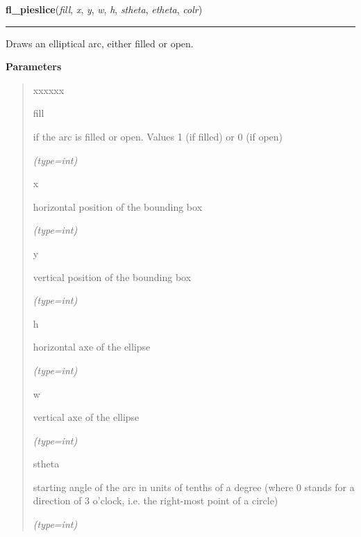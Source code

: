 \hspace{.8\funcindent}\begin{boxedminipage}{\funcwidth}

    \raggedright \textbf{fl\_pieslice}(\textit{fill}, \textit{x}, \textit{y}, \textit{w}, \textit{h}, \textit{stheta}, \textit{etheta}, \textit{colr})

    \vspace{-1.5ex}

    \rule{\textwidth}{0.5\fboxrule}
\setlength{\parskip}{2ex}
    Draws an elliptical arc, either filled or open.

\setlength{\parskip}{1ex}
      \textbf{Parameters}
      \vspace{-1ex}

      \begin{quote}
        \begin{Ventry}{xxxxxx}

          \item[fill]

          if the arc is filled or open. Values 1 (if filled) or 0 (if open)

            {\it (type=int)}

          \item[x]

          horizontal position of the bounding box

            {\it (type=int)}

          \item[y]

          vertical position of the bounding box

            {\it (type=int)}

          \item[h]

          horizontal axe of the ellipse

            {\it (type=int)}

          \item[w]

          vertical axe of the ellipse

            {\it (type=int)}

          \item[stheta]

          starting angle of the arc in units of tenths of a degree (where 0
          stands for a direction of 3 o'clock, i.e. the right-most point of
          a circle)

            {\it (type=int)}


\end{Ventry}
\end{quote}
\end{boxedminipage}
